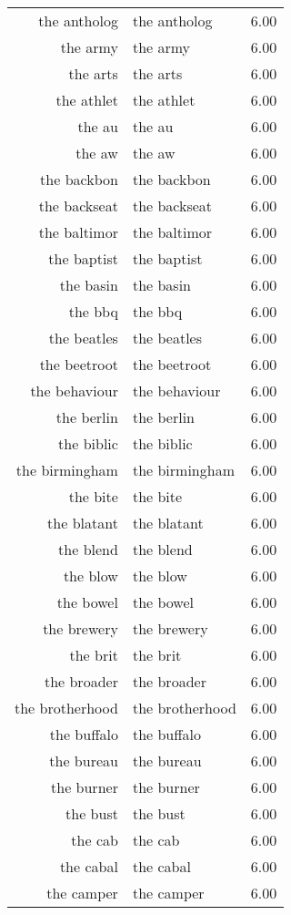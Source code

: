 \begin{table}[ht]
\begin{tabular}{rlr}
  the antholog & the antholog & 6.00 \\ 
  the army & the army & 6.00 \\ 
  the arts & the arts & 6.00 \\ 
  the athlet & the athlet & 6.00 \\ 
  the au & the au & 6.00 \\ 
  the aw & the aw & 6.00 \\ 
  the backbon & the backbon & 6.00 \\ 
  the backseat & the backseat & 6.00 \\ 
  the baltimor & the baltimor & 6.00 \\ 
  the baptist & the baptist & 6.00 \\ 
  the basin & the basin & 6.00 \\ 
  the bbq & the bbq & 6.00 \\ 
  the beatles & the beatles & 6.00 \\ 
  the beetroot & the beetroot & 6.00 \\ 
  the behaviour & the behaviour & 6.00 \\ 
  the berlin & the berlin & 6.00 \\ 
  the biblic & the biblic & 6.00 \\ 
  the birmingham & the birmingham & 6.00 \\ 
  the bite & the bite & 6.00 \\ 
  the blatant & the blatant & 6.00 \\ 
  the blend & the blend & 6.00 \\ 
  the blow & the blow & 6.00 \\ 
  the bowel & the bowel & 6.00 \\ 
  the brewery & the brewery & 6.00 \\ 
  the brit & the brit & 6.00 \\ 
  the broader & the broader & 6.00 \\ 
  the brotherhood & the brotherhood & 6.00 \\ 
  the buffalo & the buffalo & 6.00 \\ 
  the bureau & the bureau & 6.00 \\ 
  the burner & the burner & 6.00 \\ 
  the bust & the bust & 6.00 \\ 
  the cab & the cab & 6.00 \\ 
  the cabal & the cabal & 6.00 \\ 
  the camper & the camper & 6.00 \\ 

\end{tabular}
\end{table}
